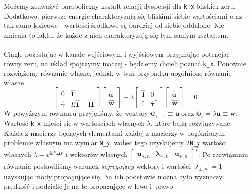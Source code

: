 \documentclass{article}
\begin{document}
Możemy zauważyć paraboliczny kształt relacji dyspersji dla \texttt{k\_x} bliskich zeru.
Dodatkowo, pierwsze energie charakteryzują się bliskimi siebie wartościami oraz tak samo końcowe - wartości środkowe są bardziej od siebie oddalone.
Nie zmienia to faktu, że każde z nich charakteryzują się tym samym kształtem.\\
\\
Ciągle pozostając w kanale wejściowym i wyjściowym przyjmując potencjał równy zeru, na układ spojrzymy inaczej - będziemy chcieli poznać \texttt{k\_x}.
Ponownie rozwiążemy równanie własne, jednak w tym przypadku uogólnione równanie własne
\begin{equation}
    \begin{bmatrix}
        0 & \mathbf{\hat{1}}\\
        \boldsymbol{\hat{\tau}} & E \mathbf{\hat{1}} - \mathbf{\hat{H}}
    \end{bmatrix}
    \begin{bmatrix}
        \mathbf{\hat{u}}\\
        \mathbf{\hat{w}}
    \end{bmatrix}
    -\lambda
    \begin{bmatrix}
        \mathbf{\hat{1}} & 0 \\
        0 & \boldsymbol{\hat{\tau}}^{\dagger}
    \end{bmatrix}
    \begin{bmatrix}
        \mathbf{\hat{u}}\\
        \mathbf{\hat{w}}
    \end{bmatrix}
    =
    0.
    \label{eq:uogolniony-problem-wlasny}
\end{equation}
W powyższym równaniu przyjęliśmy, że wektory $\boldsymbol{\psi}_{i-1}\equiv \mathbf{u}$ oraz $\boldsymbol{\psi}_i = \lambda \mathbf{u} \equiv \mathbf{w}$.
Wartość \texttt{k\_x} mieści się w wartościach własnych $\lambda$, które będą rozwiązywane.
Każda z macierzy będących elementami każdej z macierzy w uogólnionym problemie własnym ma wymiar \texttt{N\_y}, wobec tego uzyskujemy \texttt{2N\_y} wartości własnych $\lambda = \ee ^{\ii k_x ^{\pm}\Delta x}$ i wektorów własnych $\begin{bmatrix}
    \mathbf{u}_{\pm, n} & \boldsymbol{\lambda}_{\pm, n} & \mathbf{u}_{\pm, n}
\end{bmatrix}^T$.
Po rozwiązaniu równania postawiliśmy warunek \textit{segregujący} wektory i wartości $|\lambda_{\pm, n}| = 1$ uzyskując mody propagujące się.
Na ich podstawie można było wyznaczy prędkość i podzielić je na te propagujące w lewo i~prawo
\end{document}
